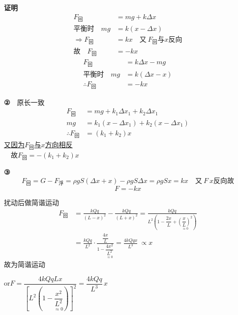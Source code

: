 \textbf{证明}
\begin{align*}
F_{\text{回}}&=mg+k\Delta x\\
\text{平衡时}\quad mg&=k(x-\Delta x)\\
\Rightarrow F_{\text{回}}&=kx\quad\text{又}\ F_{\text{回}}\text{与}x\text{反向}\\
\text{故}\quad F_{\text{回}}&=-kx
\end{align*}
\begin{align*}
F_{\text{回}}&=k\Delta x-mg\\
\text{平衡时}\quad mg&=k(\Delta x-x)\\
\therefore F_{\text{回}}&=-kx
\end{align*}

\textbf{②}　原长一致
\begin{align*}
F_{\text{回}}&=mg+k_1\Delta x_1+k_2\Delta x_1\\
mg&=k_1(x-\Delta x_1)+k_2(x-\Delta x_1)\\
\therefore F_{\text{回}}&=(k_1+k_2)x
\end{align*}
\underline{又因为$F_{\text{回}}$与$x$方向相反}\\
　故$F_{\text{回}}=-(k_1+k_2)x$

\textbf{③}
\[
F_{\text{回}}=G-F_{\text{浮}}=\rho gS(\Delta x+x)-\rho gS\Delta x=\rho gSx=kx\quad\text{又}\ F\ x\text{反向故}
\] %
\[
F=-kx
\]

扰动后做简谐运动
\begin{align*}
F_{\text{回}}&=\frac{kQq}{(L-x)^{2}}-\frac{kQq}{(L+x)^{2}}
=\frac{kQq}{L^{2}\left(1-\dfrac{2x}{L}+\underset{\approx0}{\left(\dfrac{x}{L}\right)^{2}}\right)}\\
&=\frac{kQq}{L^{2}}\cdot\frac{\dfrac{4x}{L}}{1-\underset{\approx0}{\dfrac{4x^{2}}{L^{2}}}}=\frac{4kQqx}{L^{3}}\ \propto x
\end{align*}
故为简谐运动

or\quad $F=\dfrac{4kQqLx}{\left[L^{2}\left(1-\underset{\approx0}{\dfrac{x^{2}}{L^{2}}}\right)\right]^{2}}=\dfrac{4kQq}{L^{3}}\,x$

